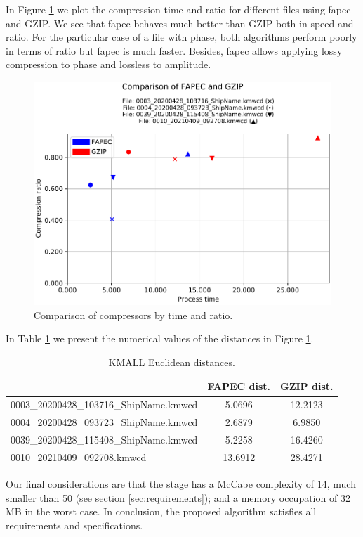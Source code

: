 In Figure \ref{fig:kmall_compare} we plot the compression time and ratio for different files using \acrshort{fapec} and GZIP. We see that \acrshort{fapec} behaves much better than GZIP both in speed and ratio. For the particular case of a file with phase, both algorithms perform poorly in terms of ratio but \acrshort{fapec} is much faster. Besides, \acrshort{fapec} allows applying lossy compression to phase and lossless to amplitude.

\begin{figure}[h!]
	\begin{center}
		\includegraphics[scale=0.69]{images/2021-05-31T23:59:08.498586-results_kmall.csv_comparison.pdf}
	\end{center}
	\caption{Comparison of compressors by time and ratio.}
	\label{fig:kmall_compare}
\end{figure}

In Table \ref{tab:kmall_compare} we present the numerical values of the distances in Figure \ref{fig:kmall_compare}.

\begin{table}[h!]
\normalsize
\centering
\begin{tabular}{|l|c|c|}
	\hline
	\rowcolor[HTML]{d6cefc} 
	\multicolumn{1}{|c|}{\cellcolor[HTML]{d6cefc}Filename}         & FAPEC dist. & GZIP dist. \\ \hline
	\cellcolor[HTML]{FFFFFF}0003\_20200428\_103716\_ShipName.kmwcd & 5.0696      & 12.2123    \\ \hline
	\cellcolor[HTML]{FFFFFF}0004\_20200428\_093723\_ShipName.kmwcd & 2.6879      & 6.9850     \\ \hline
	\cellcolor[HTML]{FFFFFF}0039\_20200428\_115408\_ShipName.kmwcd & 5.2258      & 16.4260    \\ \hline
	0010\_20210409\_092708.kmwcd                                   & 13.6912     & 28.4271    \\ \hline
\end{tabular}
\caption{KMALL Euclidean distances.}
\label{tab:kmall_compare}
\end{table}

Our final considerations are that the stage has a McCabe complexity of 14, much smaller than 50 (see section \ref{sec:requirements}); and a memory occupation of 32 MB in the worst case. In conclusion, the proposed algorithm satisfies all requirements and specifications.
